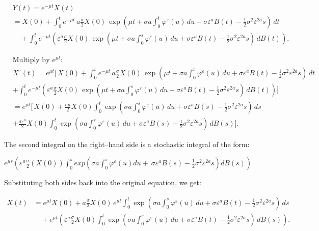 \documentclass[12pt,a4paper]{report}
\numberwithin{equation}{section}
\begin{document}
\[
\begin{aligned}
&Y(t)=e^{-\mu t}X(t) \\
&= X(0)
+ \int_{0}^{t} e^{-\mu t}\,a\frac{\sigma}{2}X(0)\,
\exp\!\left(\mu t+\sigma a\int_{0}^{t}\varphi^{\varepsilon}(u)\,du+\sigma\varepsilon^{a}B(t)-\frac{1}{2}\sigma^{2}\varepsilon^{2a}s\right)\,dt \\
&\quad + \int_{0}^{t} e^{-\mu t}\left(\varepsilon^{a}\frac{\sigma}{2}X(0)\,
\exp\!\left(\mu t+\sigma a\int_{0}^{s}\varphi^{\varepsilon}(u)\,du+\sigma\varepsilon^{a}B(t)-\frac{1}{2}\sigma^{2}\varepsilon^{2a}s\right)\,dB(t)\right).
\end{aligned}
\]

\[
\begin{aligned}
&\text{Multiply by } e^{\mu t}:\quad \\
&X^{\varepsilon}(t)
= e^{\mu t}\Bigg[\,X(0)
+ \int_{0}^{t} e^{-\mu t}\,a\frac{\sigma}{2}X(0)\,
\exp\!\left(\mu t+\sigma a\int_{0}^{t}\varphi^{\varepsilon}(u)\,du+\sigma\varepsilon^{a}B(t)-\frac{1}{2}\sigma^{2}\varepsilon^{2a}s\right)\,dt \\
&+ \int_{0}^{t} e^{-\mu t}\left(\varepsilon^{a}\frac{\sigma}{2}X(0)\,
\exp\!\left(\mu t+\sigma a\int_{0}^{s}\varphi^{\varepsilon}(u)\,du+\sigma\varepsilon^{a}B(t)-\frac{1}{2}\sigma^{2}\varepsilon^{2a}s\right)\,dB(t)\right)\Bigg] \\
&= e^{\mu t}\Bigg[\,X(0)
+ \frac{\sigma a}{2}X(0)\int_{0}^{t}\exp\!\left(\sigma a\int_{0}^{s}\varphi^{\varepsilon}(u)\,du+\sigma\varepsilon^{a}B(s)-\frac{1}{2}\sigma^{2}\varepsilon^{2a}s\right)\,ds \\
&+ \frac{\sigma\varepsilon^{a}}{2}X(0)\int_{0}^{t}\exp\!\left(\sigma a\int_{0}^{s}\varphi^{\varepsilon}(u)\,du+\sigma\varepsilon^{a}B(s)-\frac{1}{2}\sigma^{2}\varepsilon^{2a}s\right)\,dB(s)\Bigg].
\end{aligned}
\]





The second integral on the right--hand side is a stochastic integral of
the form:

\(e^{\mu s}\left( \varepsilon^{a}\frac{\sigma}{2}(X(0))\int_{0}^{s}{exp\left( \sigma a\int_{0}^{s}{\varphi^{\varepsilon}(u)du + \ {\sigma\varepsilon}^{a}B(s)} - \frac{1}{2}\sigma^{2}\varepsilon^{2a}s \right)}dB(s) \right)\)

Substituting both sides back into the original equation, we get:

\[
\begin{aligned}
X(t)
&= e^{\mu t}X(0)
+ a\frac{\sigma}{2}X(0)\,e^{\mu t}\int_{0}^{t}
\exp\!\left(\sigma a\int_{0}^{s}\varphi^{\varepsilon}(u)\,du+\sigma\varepsilon^{a}B(t)-\frac{1}{2}\sigma^{2}\varepsilon^{2a}s\right)\,ds \\
&\quad + e^{\mu t}\left(\varepsilon^{a}\frac{\sigma}{2}X(0)\int_{0}^{t}
\exp\!\left(\sigma a\int_{0}^{s}\varphi^{\varepsilon}(u)\,du+\sigma\varepsilon^{a}B(t)-\frac{1}{2}\sigma^{2}\varepsilon^{2a}s\right)\,dB(s)\right).
\end{aligned}
\]
\end{document}
